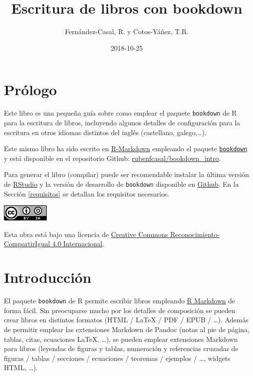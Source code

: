 \documentclass[]{book}
\title{Escritura de libros con bookdown}
\author{Fernández-Casal, R. y Cotos-Yáñez, T.R.}
\date{2018-10-25}
\theoremstyle{definition}
\theoremstyle{definition}
\theoremstyle{definition}
\theoremstyle{remark}
\begin{document}
\maketitle

{
\setcounter{tocdepth}{1}
\tableofcontents
}
\chapter*{Prólogo}\label{prologo}

Este libro es una pequeña guía sobre como emplear el paquete
\texttt{bookdown} de R para la escritura de libros, incluyendo algunos
detalles de configuración para la escritura en otros idiomas distintos
del inglés (castellano, galego,\ldots{}).

Este mismo libro ha sido escrito en
\href{http://rmarkdown.rstudio.com}{R-Markdown} empleando el paquete
\href{https://bookdown.org/yihui/bookdown/}{\texttt{bookdown}} y está
disponible en el repositorio Github:
\href{https://github.com/rubenfcasal/bookdown_intro}{rubenfcasal/bookdown\_intro}.

Para generar el libro (compilar) puede ser recomendable instalar la
última versión de
\href{(https://www.rstudio.com/products/rstudio/download/)}{RStudio} y
la versión de desarrollo de \texttt{bookdown} disponible en
\href{https://github.com/rstudio/bookdown}{Github}. En la Sección
\ref{requisitos} se detallan los requisitos necesarios.

\begin{flushleft}\includegraphics{images/by-sa-88x31} \end{flushleft}

Esta obra está bajo una licencia de
\href{https://creativecommons.org/licenses/by-sa/4.0/deed.es}{Creative
Commons Reconocimiento-CompartirIgual 4.0 Internacional}.

\chapter{Introducción}\label{intro}

El paquete \texttt{bookdown} \citep{R-bookdown} de R \citep{R-base}
permite escribir libros empleando \href{http://rmarkdown.rstudio.com}{R
Markdown} de forma fácil. Sin preocuparse mucho por los detalles de
composición se pueden crear libros en distintos formatos (HTML / LaTeX /
PDF / EPUB / \ldots{}). Además de permitir emplear las extensiones
Markdown de Pandoc (notas al pie de página, tablas, citas, ecuaciones
LaTeX, \ldots{}), se pueden emplear extensiones Markdown para libros
(leyendas de figuras y tablas, numeración y referencias cruzadas de
figuras / tablas / secciones / ecuaciones / teoremas / ejemplos /
\ldots{}, widgets HTML, \ldots{}).
\end{document}

